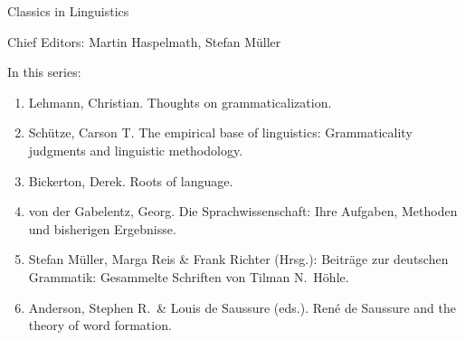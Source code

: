 {\large Classics in Linguistics}

\bigskip

Chief Editors: Martin Haspelmath, Stefan Müller

\bigskip

In this series:

\begin{enumerate}
\item Lehmann, Christian. Thoughts on grammaticalization.
\item Schütze, Carson T. The empirical base of linguistics: Grammaticality judgments and linguistic methodology.
\item Bickerton, Derek. Roots of language.
\item von der Gabelentz, Georg. Die Sprachwissenschaft:  Ihre Aufgaben, Methoden und bisherigen Ergebnisse.
\item Stefan Müller, Marga Reis \& Frank Richter (Hrsg.): Beiträge zur deutschen Grammatik: Gesammelte Schriften von Tilman N.\ Höhle.
\item Anderson, Stephen R.\ \& Louis de Saussure (eds.). René de Saussure and the theory of word formation.
\end{enumerate}


\vfill

